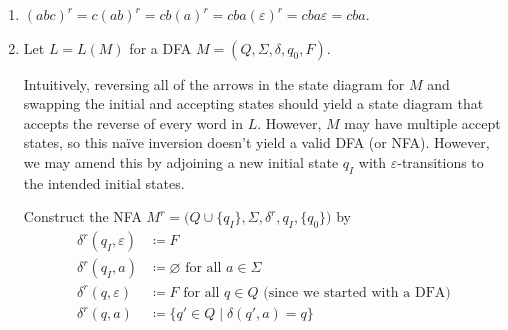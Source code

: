 \documentclass{article}
\theoremstyle{definition}
\theoremstyle{definition}
\theoremstyle{remark}
\begin{document}
\begin{enumerate}
    \item[$(i)$] $(abc)^r=c(ab)^r=cb(a)^r=cba(\varepsilon)^r=cba\varepsilon=cba$.
    
    \item[$(ii)$] Let $L=L(M)$ for a DFA $M=(Q,\Sigma,\delta,q_0,F)$.
    
    Intuitively, reversing all of the arrows in the state diagram for $M$ and swapping the initial and accepting states should yield a state diagram that accepts the reverse of every word in $L$. However, $M$ may have multiple accept states, so this naïve inversion doesn't yield a valid DFA (or NFA). However, we may amend this by adjoining a new initial state $q_I$ with $\varepsilon$-transitions to the intended initial states.

    Construct the NFA $M^r=\bigl(Q\cup\{q_I\},\Sigma,\delta^r,q_I,\{q_0\}\bigr)$ by
    \begin{align*}
        \delta^r(q_I,\varepsilon)&\coloneqq F\\
        \delta^r(q_I,a)&\coloneqq\varnothing\text{ for all }a\in\Sigma\\
        \delta^r(q,\varepsilon)&\coloneqq F\text{ for all }q\in Q\text{ (since we started with a DFA)}\\
        \delta^r(q,a)&\coloneqq\bigl\{q'\in Q\mid\delta(q',a)=q\bigr\}
    \end{align*}
\end{enumerate}
\end{document}
